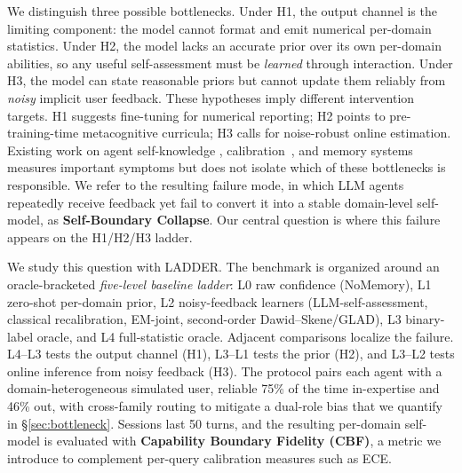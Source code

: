\documentclass[11pt]{article}
\begin{document}
We distinguish three possible bottlenecks. Under H1, the output channel is the limiting component: the model cannot format and emit numerical per-domain statistics. Under H2, the model lacks an accurate prior over its own per-domain abilities, so any useful self-assessment must be \emph{learned} through interaction. Under H3, the model can state reasonable priors but cannot update them reliably from \emph{noisy} implicit user feedback. These hypotheses imply different intervention targets. H1 suggests fine-tuning for numerical reporting; H2 points to pre-training-time metacognitive curricula; H3 calls for noise-robust online estimation. Existing work on agent self-knowledge \citep{barkan2026capable, hu2026memoryagent}, calibration~\citep{kadavath2022language, guo2017calibration, xiong2024can}, and memory systems~\citep{packer2023memgpt, mem02025, tan2025rmm, xu2025amem, li2025memos} measures important symptoms but does not isolate which of these bottlenecks is responsible. We refer to the resulting failure mode, in which LLM agents repeatedly receive feedback yet fail to convert it into a stable domain-level self-model, as \textbf{Self-Boundary Collapse}. Our central question is where this failure appears on the H1/H2/H3 ladder.

We study this question with LADDER. The benchmark is organized around an oracle-bracketed \emph{five-level baseline ladder}: L0 raw confidence (NoMemory), L1 zero-shot per-domain prior, L2 noisy-feedback learners (LLM-self-assessment, classical recalibration, EM-joint, second-order Dawid--Skene/GLAD), L3 binary-label oracle, and L4 full-statistic oracle. Adjacent comparisons localize the failure. L4--L3 tests the output channel (H1), L3--L1 tests the prior (H2), and L3--L2 tests online inference from noisy feedback (H3). The protocol pairs each agent with a domain-heterogeneous simulated user, reliable 75\% of the time in-expertise and 46\% out, with cross-family routing to mitigate a dual-role bias that we quantify in \S\ref{sec:bottleneck}. Sessions last 50 turns, and the resulting per-domain self-model is evaluated with \textbf{Capability Boundary Fidelity (CBF)}, a metric we introduce to complement per-query calibration measures such as ECE.
\end{document}
